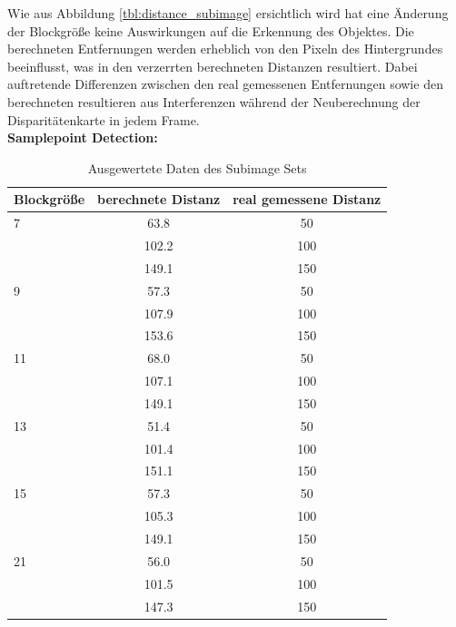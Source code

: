 \noindent
Wie aus Abbildung \ref{tbl:distance_subimage} ersichtlich wird hat eine Änderung der Blockgröße keine Auswirkungen auf die Erkennung des Objektes. Die berechneten Entfernungen werden erheblich von den Pixeln des Hintergrundes beeinflusst, was in den verzerrten berechneten Distanzen resultiert. Dabei auftretende Differenzen zwischen den real gemessenen Entfernungen sowie den berechneten resultieren aus Interferenzen während der Neuberechnung der Disparitätenkarte in jedem Frame.\\

\noindent
\textbf{Samplepoint Detection:}\\

\begin{table}[h]
\centering
\begin{tabular}{|l||c|c|}
\hline
Blockgröße & berechnete Distanz & real gemessene Distanz \\
\hline\hline
7          & 63.8               & 50                     \\
           & 102.2              & 100                    \\
           & 149.1              & 150                    \\
\hline
9          & 57.3               & 50                     \\
           & 107.9              & 100                    \\
           & 153.6              & 150                    \\
\hline
11         & 68.0               & 50                     \\
           & 107.1              & 100                    \\
           & 149.1              & 150                    \\
\hline
13         & 51.4               & 50                     \\
           & 101.4              & 100                    \\
           & 151.1              & 150                    \\
\hline
15         & 57.3               & 50                     \\
           & 105.3              & 100                    \\
           & 149.1              & 150                    \\
\hline
21         & 56.0               & 50                     \\
           & 101.5              & 100                    \\
           & 147.3              & 150                    \\
\hline
\end{tabular}
\caption{Ausgewertete Daten des Subimage Sets }
\label{tbl:distance_samplepoint}
\end{table}

